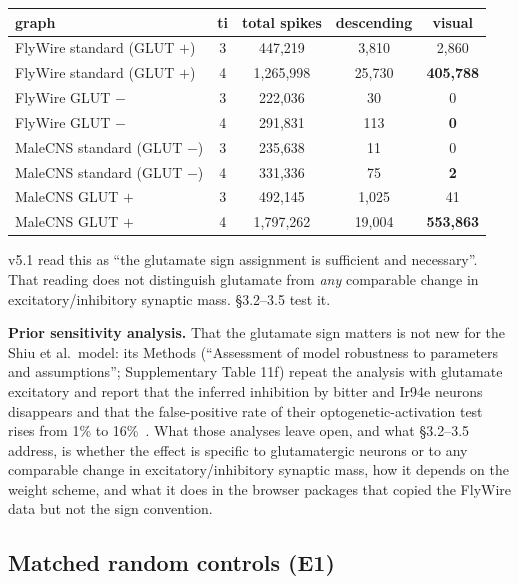 \documentclass[11pt,a4paper]{article}
\begin{document}
\begin{center}
\footnotesize
\begin{tabular}{lcccc}
\toprule
graph & ti & total spikes & descending & visual \\
\midrule
FlyWire standard (GLUT $+$) & 3 & 447,219 & 3,810 & 2,860 \\
FlyWire standard (GLUT $+$) & 4 & 1,265,998 & 25,730 & \textbf{405,788} \\
FlyWire GLUT $-$ & 3 & 222,036 & 30 & 0 \\
FlyWire GLUT $-$ & 4 & 291,831 & 113 & \textbf{0} \\
MaleCNS standard (GLUT $-$) & 3 & 235,638 & 11 & 0 \\
MaleCNS standard (GLUT $-$) & 4 & 331,336 & 75 & \textbf{2} \\
MaleCNS GLUT $+$ & 3 & 492,145 & 1,025 & 41 \\
MaleCNS GLUT $+$ & 4 & 1,797,262 & 19,004 & \textbf{553,863} \\
\bottomrule
\end{tabular}
\end{center}

v5.1 read this as ``the glutamate sign assignment is sufficient and
necessary''. That reading does not distinguish glutamate from \emph{any}
comparable change in excitatory/inhibitory synaptic mass. \S3.2--3.5 test it.

\textbf{Prior sensitivity analysis.} That the glutamate sign matters is not new
for the Shiu et al.\ model: its Methods (``Assessment of model robustness to
parameters and assumptions''; Supplementary Table 11f) repeat the analysis with
glutamate excitatory and report that the inferred inhibition by bitter and
Ir94e neurons disappears and that the false-positive rate of their
optogenetic-activation test rises from 1\% to 16\%~\cite{shiu2024}. What those
analyses leave open, and what \S3.2--3.5 address, is whether the effect is
specific to glutamatergic neurons or to any comparable change in
excitatory/inhibitory synaptic mass, how it depends on the weight scheme, and
what it does in the browser packages that copied the FlyWire data but not the
sign convention.

\subsection{Matched random controls (E1)}
\end{document}
